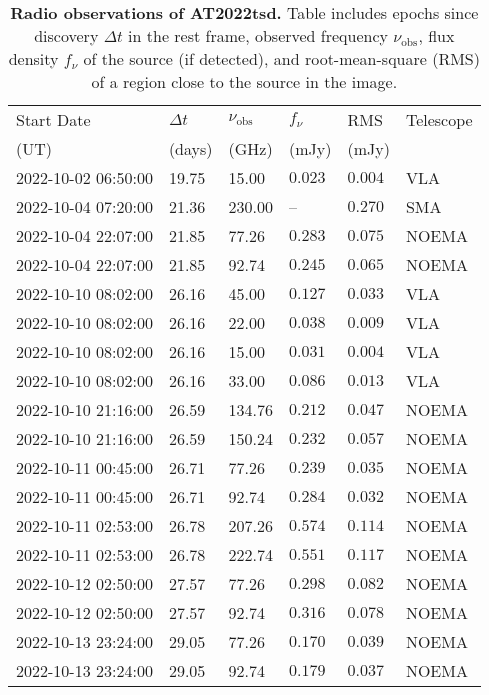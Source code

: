 \documentclass{nature_plusfigure}
\begin{document}
\begin{supplement}
\begin{center} 
\begin{longtable}{llllll} 
\caption{\textbf{Radio observations of AT2022tsd.} Table includes epochs since discovery $\Delta t$ in the rest frame, observed frequency $\nu_\mathrm{obs}$, flux density $f_\nu$ of the source (if detected), and root-mean-square (RMS) of a region close to the source in the image.} 
\label{tab:radio-observations}\\ 
\hline\hline
Start Date & $\Delta t$ & $\nu_\mathrm{obs}$ & $f_\nu$ & RMS & Telescope\\ 
(UT) & (days) & (GHz) & (mJy) & (mJy) & \\ 
\hline
2022-10-02 06:50:00 & 19.75 & 15.00 & $0.023$ & $0.004$ & VLA \\ 
2022-10-04 07:20:00 & 21.36 & 230.00 & -- & $0.270$ & SMA \\ 
2022-10-04 22:07:00 & 21.85 & 77.26 & $0.283$ & $0.075$ & NOEMA \\ 
2022-10-04 22:07:00 & 21.85 & 92.74 & $0.245$ & $0.065$ & NOEMA \\ 
2022-10-10 08:02:00 & 26.16 & 45.00 & $0.127$ & $0.033$ & VLA \\ 
2022-10-10 08:02:00 & 26.16 & 22.00 & $0.038$ & $0.009$ & VLA \\ 
2022-10-10 08:02:00 & 26.16 & 15.00 & $0.031$ & $0.004$ & VLA \\ 
2022-10-10 08:02:00 & 26.16 & 33.00 & $0.086$ & $0.013$ & VLA \\ 
2022-10-10 21:16:00 & 26.59 & 134.76 & $0.212$ & $0.047$ & NOEMA \\ 
2022-10-10 21:16:00 & 26.59 & 150.24 & $0.232$ & $0.057$ & NOEMA \\ 
2022-10-11 00:45:00 & 26.71 & 77.26 & $0.239$ & $0.035$ & NOEMA \\ 
2022-10-11 00:45:00 & 26.71 & 92.74 & $0.284$ & $0.032$ & NOEMA \\ 
2022-10-11 02:53:00 & 26.78 & 207.26 & $0.574$ & $0.114$ & NOEMA \\ 
2022-10-11 02:53:00 & 26.78 & 222.74 & $0.551$ & $0.117$ & NOEMA \\ 
2022-10-12 02:50:00 & 27.57 & 77.26 & $0.298$ & $0.082$ & NOEMA \\ 
2022-10-12 02:50:00 & 27.57 & 92.74 & $0.316$ & $0.078$ & NOEMA \\ 
2022-10-13 23:24:00 & 29.05 & 77.26 & $0.170$ & $0.039$ & NOEMA \\ 
2022-10-13 23:24:00 & 29.05 & 92.74 & $0.179$ & $0.037$ & NOEMA \\ 

\end{longtable}
\end{center}
\end{supplement}
\end{document}
